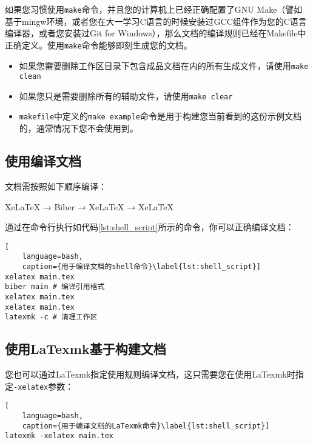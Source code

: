 如果您习惯使用\texttt{make}命令，并且您的计算机上已经正确配置了GNU Make（譬如基于mingw环境，或者您在大一学习C语言的时候安装过GCC组件作为您的C语言编译器，或者您安装过Git for Windows），那么文档的编译规则已经在Makefile中正确定义。使用\texttt{make}命令能够即刻生成您的文档。

\begin{itemize}
    \item 如果您需要删除工作区目录下包含成品文档在内的所有生成文件，请使用\texttt{make clean}
    \item 如果您只是需要删除所有的辅助文件，请使用\texttt{make clear}
    \item \texttt{makefile}中定义的\texttt{make example}命令是用于构建您当前看到的这份示例文档的，通常情况下您不会使用到。
\end{itemize}

\subsection{使用\XeLaTeX 编译文档}

文档需按照如下顺序编译：

XeLaTeX → Biber → XeLaTeX → XeLaTeX

通过在命令行执行如代码\ref{lst:shell_script}所示的命令，你可以正确编译文档：

\begin{lstlisting}[
    language=bash,
    caption={用于编译文档的shell命令}\label{lst:shell_script}]
xelatex main.tex
biber main # 编译引用格式
xelatex main.tex
xelatex main.tex
latexmk -c # 清理工作区
\end{lstlisting}

\subsection{使用LaTexmk基于\XeLaTeX 构建文档}

您也可以通过LaTexmk指定使用\XeLaTeX 规则编译文档，这只需要您在使用LaTexmk时指定\texttt{-xelatex}参数：

\begin{lstlisting}[
    language=bash,
    caption={用于编译文档的LaTexmk命令}\label{lst:shell_script}]
latexmk -xelatex main.tex
\end{lstlisting}
